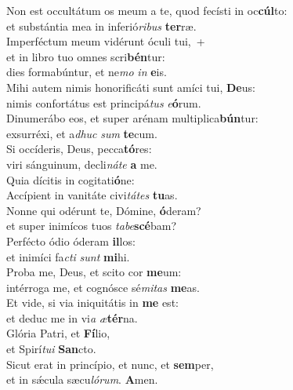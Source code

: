 \evenverse Non est occultátum os meum a te, quod fecísti in oc\textbf{cúl}to:~\*\\
\evenverse et substántia mea in inferió\textit{ri}\textit{bus} \textbf{ter}ræ.\\
\oddverse Imperféctum meum vidérunt óculi tui,~+\\
\oddverse  et in libro tuo omnes scri\textbf{bén}tur:~\*\\
\oddverse dies formabúntur, et ne\textit{mo} \textit{in} \textbf{e}is.\\
\evenverse Mihi autem nimis honorificáti sunt amíci tui, \textbf{De}us:~\*\\
\evenverse nimis confortátus est principá\textit{tus} \textit{e}\textbf{ó}rum.\\
\oddverse Dinumerábo eos, et super arénam multiplica\textbf{bún}tur:~\*\\
\oddverse exsurréxi, et a\textit{dhuc} \textit{sum} \textbf{te}cum.\\
\evenverse Si occíderis, Deus, pecca\textbf{tó}res:~\*\\
\evenverse viri sánguinum, decli\textit{ná}\textit{te} \textbf{a} me.\\
\oddverse Quia dícitis in cogitati\textbf{ó}ne:~\*\\
\oddverse Accípient in vanitáte civi\textit{tá}\textit{tes} \textbf{tu}as.\\
\evenverse Nonne qui odérunt te, Dómine, \textbf{ó}deram?~\*\\
\evenverse et super inimícos tuos \textit{ta}\textit{be}\textbf{scé}bam?\\
\oddverse Perfécto ódio óderam \textbf{il}los:~\*\\
\oddverse et inimíci fa\textit{cti} \textit{sunt} \textbf{mi}hi.\\
\evenverse Proba me, Deus, et scito cor \textbf{me}um:~\*\\
\evenverse intérroga me, et cognósce sé\textit{mi}\textit{tas} \textbf{me}as.\\
\oddverse Et vide, si via iniquitátis in \textbf{me} est:~\*\\
\oddverse et deduc me in vi\textit{a} \textit{æ}\textbf{tér}na.\\
\evenverse Glória Patri, et \textbf{Fí}lio,~\*\\
\evenverse et Spirí\textit{tu}\textit{i} \textbf{San}cto.\\
\oddverse Sicut erat in princípio, et nunc, et \textbf{sem}per,~\*\\
\oddverse et in sǽcula sæcu\textit{ló}\textit{rum}. \textbf{A}men.\\

